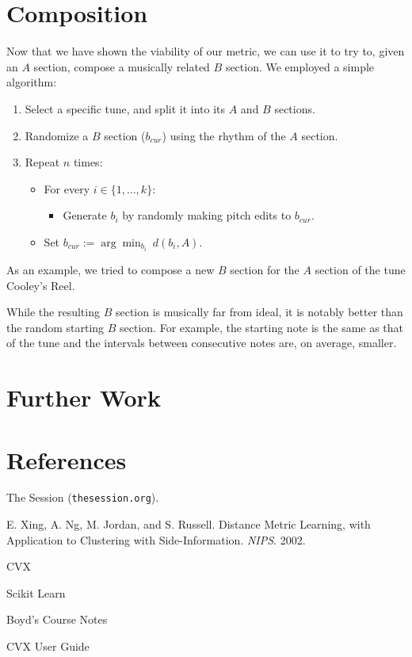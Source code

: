 \documentclass{article} %
\begin{document}
\section{Composition}
Now that we have shown the viability of our metric, we can use it to try to,
given an $A$ section, compose a musically related $B$ section. We employed a
simple algorithm:
\begin{enumerate}
\item Select a specific tune, and split it into its $A$ and $B$ sections.

\item Randomize a $B$ section ($b_{cur}$) using the rhythm of the $A$ section.

\item Repeat $n$ times:
\begin{itemize}\parskip=0.05in
\item[] For every $i \in \{1, \dots, k\}$:
\begin{itemize}
\item[] Generate $b_i$ by randomly making pitch edits to $b_{cur}$.
\end{itemize}
\item[] Set
$\displaystyle{b_{cur} := \arg \min_{b_i} \  d(b_i, A)}$.
\end{itemize}
\end{enumerate}
As an example, we tried to compose a new $B$ section for the $A$ section of the
tune Cooley's Reel. %

While the resulting $B$ section is musically far from ideal, it is notably
better than the random starting $B$ section. For example, the starting note is
the same as that of the tune and the intervals between consecutive notes are, on
average, smaller.

\section{Further Work}

\section{References}
\begin{enumerate}[label={[\arabic*]}]
\item The Session (\texttt{thesession.org}).

\item
E. Xing, A. Ng, M. Jordan, and S. Russell. Distance Metric Learning, with
Application to Clustering with Side-Information. \textit{NIPS}. 2002.

\item CVX

\item Scikit Learn

\item Boyd's Course Notes

\item CVX User Guide
\end{enumerate}
\end{document}
